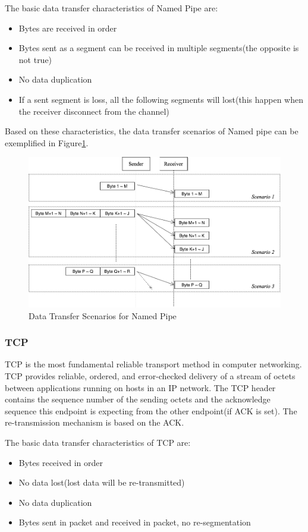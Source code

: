 The basic data transfer characteristics of Named Pipe are:
\begin{itemize}
  \item Bytes are received in order
  \item Bytes sent as a segment can be received in multiple segments(the opposite is not true)
  \item No data duplication
  \item If a sent segment is loss, all the following segments will lost(this happen when the receiver disconnect from the channel) 
  
\end{itemize}

Based on these characteristics, the data transfer scenarios of Named pipe can be exemplified in Figure\ref{namedpipe}. 
\begin{figure}[H]
\centerline{\includegraphics[scale=0.48]{Figures/namedpipe}}
\caption{Data Transfer Scenarios for Named Pipe}
\label{namedpipe}
\end{figure}

\subsubsection{TCP}\label{tcp}
TCP is the most fundamental reliable transport method in computer networking. TCP provides reliable, ordered, and error-checked delivery of a stream of octets between applications running on hosts in an IP network. The TCP header contains the sequence number of the sending octets and the acknowledge sequence this endpoint is expecting from the other endpoint(if ACK is set). The re-transmission mechanism is based on the ACK. 

The basic data transfer characteristics of TCP are:
\begin{itemize}
  \item Bytes received in order
  \item No data lost(lost data will be re-transmitted)
  \item No data duplication
  \item Bytes sent in packet and received in packet, no re-segmentation
\end{itemize}

